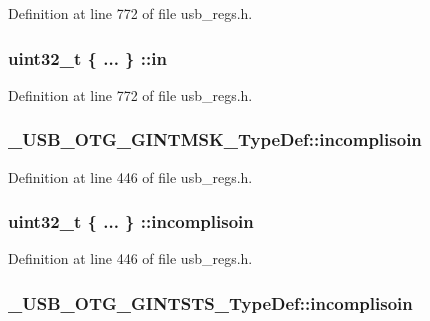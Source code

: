 Definition at line 772 of file usb\-\_\-regs.\-h.

\hypertarget{group___u_s_b___o_t_g___d_r_i_v_e_r_gab135d24a12319145f6be797ba1cb730a}{
\subsubsection[{in}]{\setlength{\rightskip}{0pt plus 5cm}uint32\-\_\-t \{ ... \} \-::in}}\label{group___u_s_b___o_t_g___d_r_i_v_e_r_gab135d24a12319145f6be797ba1cb730a}


Definition at line 772 of file usb\-\_\-regs.\-h.

\hypertarget{group___u_s_b___o_t_g___d_r_i_v_e_r_ga997c1a77060631b4a4c5eccfd51ddb38}{
\subsubsection[{incomplisoin}]{ \-\_\-\-U\-S\-B\-\_\-\-O\-T\-G\-\_\-\-G\-I\-N\-T\-M\-S\-K\-\_\-\-Type\-Def\-::incomplisoin}}\label{group___u_s_b___o_t_g___d_r_i_v_e_r_ga997c1a77060631b4a4c5eccfd51ddb38}


Definition at line 446 of file usb\-\_\-regs.\-h.

\hypertarget{group___u_s_b___o_t_g___d_r_i_v_e_r_ga0ae52ded260645412e20429bad17050d}{
\subsubsection[{incomplisoin}]{\setlength{\rightskip}{0pt plus 5cm}uint32\-\_\-t \{ ... \} \-::incomplisoin}}\label{group___u_s_b___o_t_g___d_r_i_v_e_r_ga0ae52ded260645412e20429bad17050d}


Definition at line 446 of file usb\-\_\-regs.\-h.

\hypertarget{group___u_s_b___o_t_g___d_r_i_v_e_r_gafb6b6a219e9b7ecd82a3e8223e7f4157}{
\subsubsection[{incomplisoin}]{ \-\_\-\-U\-S\-B\-\_\-\-O\-T\-G\-\_\-\-G\-I\-N\-T\-S\-T\-S\-\_\-\-Type\-Def\-::incomplisoin}}\label{group___u_s_b___o_t_g___d_r_i_v_e_r_gafb6b6a219e9b7ecd82a3e8223e7f4157}


